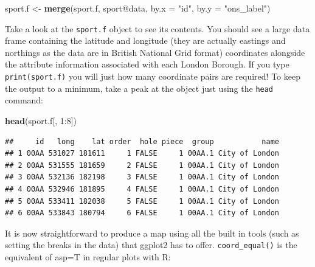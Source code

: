 \documentclass[]{article}
\newenvironment{Shaded}{}{}
\newcommand{\KeywordTok}[1]{\textcolor[rgb]{0.00,0.44,0.13}{\textbf{{#1}}}}
\newcommand{\DataTypeTok}[1]{\textcolor[rgb]{0.56,0.13,0.00}{{#1}}}
\newcommand{\DecValTok}[1]{\textcolor[rgb]{0.25,0.63,0.44}{{#1}}}
\newcommand{\StringTok}[1]{\textcolor[rgb]{0.25,0.44,0.63}{{#1}}}
\newcommand{\NormalTok}[1]{{#1}}
\begin{document}
\begin{Shaded}
\begin{Highlighting}[]
\NormalTok{sport.f <- }\KeywordTok{merge}\NormalTok{(sport.f, sport@data, }\DataTypeTok{by.x =} \StringTok{"id"}\NormalTok{, }\DataTypeTok{by.y =} \StringTok{"ons_label"}\NormalTok{)}
\end{Highlighting}
\end{Shaded}
Take a look at the \texttt{sport.f} object to see its contents. You
should see a large data frame containing the latitude and longitude
(they are actually eastings and northings as the data are in British
National Grid format) coordinates alongside the attribute information
associated with each London Borough. If you type \texttt{print(sport.f)}
you will just how many coordinate pairs are required! To keep the output
to a minimum, take a peak at the object just using the \texttt{head}
command:

\begin{Shaded}
\begin{Highlighting}[]
\KeywordTok{head}\NormalTok{(sport.f[, }\DecValTok{1}\NormalTok{:}\DecValTok{8}\NormalTok{])}
\end{Highlighting}
\end{Shaded}
\begin{verbatim}
##     id   long    lat order  hole piece  group           name
## 1 00AA 531027 181611     1 FALSE     1 00AA.1 City of London
## 2 00AA 531555 181659     2 FALSE     1 00AA.1 City of London
## 3 00AA 532136 182198     3 FALSE     1 00AA.1 City of London
## 4 00AA 532946 181895     4 FALSE     1 00AA.1 City of London
## 5 00AA 533411 182038     5 FALSE     1 00AA.1 City of London
## 6 00AA 533843 180794     6 FALSE     1 00AA.1 City of London
\end{verbatim}
It is now straightforward to produce a map using all the built in tools
(such as setting the breaks in the data) that ggplot2 has to offer.
\texttt{coord\_equal()} is the equivalent of asp=T in regular plots with
R:
\end{document}
